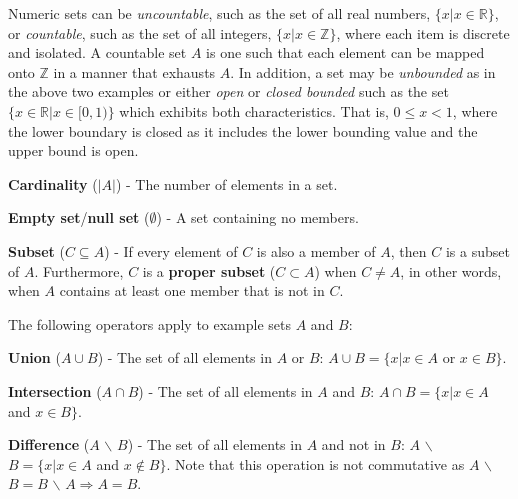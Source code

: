 Numeric sets can be \emph{uncountable}, such as the set of all real numbers, $\{x| x \in \mathbb{R}\}$, or \emph{countable}, such as the set of all integers, $\{x| x \in \mathbb{Z}\}$, where each item is discrete and isolated.
%
A countable set $A$ is one such that each element can be mapped onto $\mathbb{Z}$ in a manner that exhausts $A$.
%
In addition, a set may be \emph{unbounded} as in the above two examples or either \emph{open} or \emph{closed bounded} such as the set $\{x \in \mathbb{R} | x \in [0,1)\}$ which exhibits both characteristics.
%
That is, $0 \le x < 1$, where the lower boundary is closed as it includes the lower bounding value and the upper bound is open.

\begin{defn}
  \textbf{Cardinality} ($|A|$) - The number of elements in a set.
\end{defn}

\begin{defn}
  \textbf{Empty set}/\textbf{null set} ($\emptyset$) - A set containing no members.
\end{defn}

\begin{defn}
  \textbf{Subset} ($C \subseteq A$) - If every element of $C$ is also a member of $A$, then $C$ is a subset of $A$.
  Furthermore, $C$ is a \textbf{proper subset} ($C \subset A$) when $C \neq A$, in other words, when $A$ contains at least one member that is not in $C$.
\end{defn}

The following operators apply to example sets $A$ and $B$:

\begin{defn}
  \textbf{Union} ($A \cup B$) - The set of all elements in $A$ or $B$: $A \cup B = \{x| x \in A$ or $x \in B\}$.
\end{defn}

\begin{defn}
  \textbf{Intersection} ($A \cap B$) - The set of all elements in $A$ and $B$: $A \cap B = \{x| x \in A$ and $x \in B\}$.
\end{defn}

\begin{defn}
  \textbf{Difference} ($A$ $\backslash$ $B$) - The set of all elements in $A$ and not in $B$: $A$ $\backslash$ $B = \{x| x \in A$ and $x \notin B\}$.
  Note that this operation is not commutative as $A$ $\backslash$ $B = B$ $\backslash$ $A \Rightarrow A = B$.
\end{defn}

